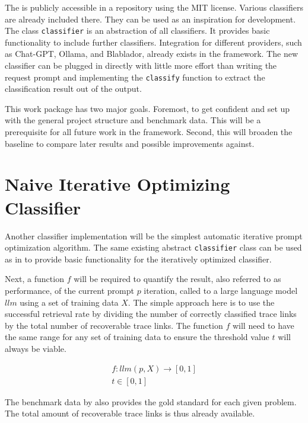 The \LiSSAf is publicly accessible in a repository using the MIT license. Various classifiers are already included there.
They can be used as an inspiration for development.
The class \verb|classifier| is an abstraction of all classifiers.
It provides basic functionality to include further classifiers.
Integration for different \LLM providers, such as Chat-GPT, Ollama, and Blablador, already exists in the framework.
The new classifier can be plugged in directly with little more effort than writing the request prompt and implementing the \verb|classify| function to extract the classification result out of the \LLM output.

This work package has two major goals.
Foremost, to get confident and set up with the general project structure and benchmark data.
This will be a prerequisite for all future work in the \LiSSA framework.
Second, this will broaden the baseline to compare later results and possible improvements against.




\section{Naive Iterative Optimizing Classifier}
\label{approach:sec:naive_iterative}
Another classifier implementation will be the simplest automatic iterative prompt optimization algorithm.
The same existing abstract \verb|classifier| class can be used as in  to provide basic functionality for the iteratively optimized classifier.

Next, a function $f$ will be required to quantify the result, also referred to as performance, of the current prompt $p$ iteration, called to a large language model $llm$ using a set of training data $X$.
The simple approach here is to use the successful retrieval rate by dividing the number of correctly classified trace links by the total number of recoverable trace links.
The function $f$ will need to have the same range for any set of training data to ensure the threshold value $t$ will always be viable.

\begin{align}
        f: llm(p, X) \rightarrow [0, 1] \\
        t \in [0, 1]
\end{align}

The benchmark data by  also provides the gold standard for each given problem.
The total amount of recoverable trace links is thus already available. 

